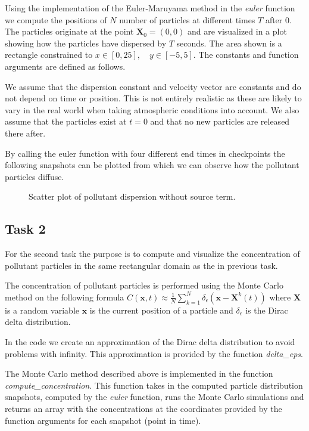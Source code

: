 \documentclass[11pt]{article}
\begin{document}
Using the implementation of the Euler-Maruyama method in the
\emph{euler} function we compute the positions of \(N\) number of
particles at different times \(T\) after 0. The particles originate at
the point \(\mathbf{X}_0 = (0,0)\) and are visualized in a plot showing
how the particles have dispersed by \(T\) seconds. The area shown is a
rectangle constrained to \(x \in [0, 25], \quad y \in [-5, 5]\). The
constants and function arguments are defined as follows.

We assume that the dispersion constant and velocity vector are constants
and do not depend on time or position. This is not entirely realistic as
these are likely to vary in the real world when taking atmospheric
conditions into account. We also assume that the particles exist at
\(t=0\) and that no new particles are released there after.

By calling the euler function with four different end times in
checkpoints the following snapshots can be plotted from which we can
observe how the pollutant particles diffuse.

    \begin{figure}[H]
    \centering
    \caption{Scatter plot of pollutant dispersion without source term.}
    \end{figure}

\subsection{Task 2}\label{task-2}

For the second task the purpose is to compute and visualize the
concentration of pollutant particles in the same rectangular domain as
the in previous task.

The concentration of pollutant particles is performed using the Monte
Carlo method on the following formula
\(C(\mathbf{x},t) \approx \frac{1}{N} \sum_{k=1}^N \delta_{\epsilon} (\mathbf{x}-\mathbf{X}^k(t))\)
where \(\mathbf{X}\) is a random variable \(\mathbf{x}\) is the current
position of a particle and \(\delta_\epsilon\) is the Dirac delta
distribution.

In the code we create an approximation of the Dirac delta distribution
to avoid problems with infinity. This approximation is provided by the
function \emph{delta\_eps}.

The Monte Carlo method described above is implemented in the function
\emph{compute\_concentration}. This function takes in the computed
particle distribution snapshots, computed by the \emph{euler} function,
runs the Monte Carlo simulations and returns an array with the
concentrations at the coordinates provided by the function arguments for
each snapshot (point in time).
\end{document}
